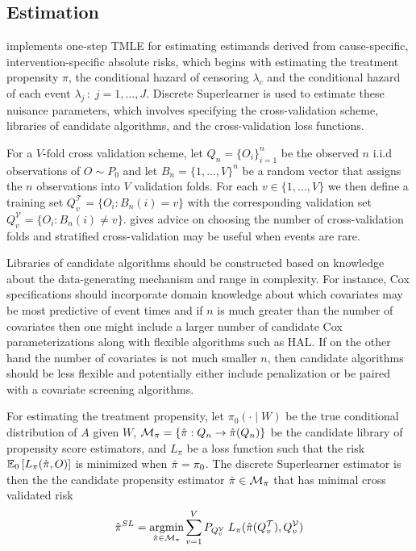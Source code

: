 \documentclass{report}
\DeclareMathOperator*{\argmin}{argmin}
\newcommand{\1}{\ensuremath{\mathbf{1}}}
\newcommand{\X}{\ensuremath{{W}}}
\newcommand{\g}{\ensuremath{\pi}}
\begin{document}
\subsection{Estimation}
\label{estimation}
 implements one-step TMLE for estimating estimands derived from cause-specific, intervention-specific absolute risks, which begins with estimating the treatment propensity \(\g\), the conditional hazard of censoring \(\lambda_c\) and the conditional hazard of each event \(\lambda_j \,:\; j = 1, \dots, J\). Discrete Superlearner is used to estimate these nuisance parameters, which involves specifying the cross-validation scheme, libraries of candidate algorithms, and the cross-validation loss functions.

For a \(V\text{-fold}\) cross validation scheme, let \(Q_n = \{O_i\}_{i=1}^n\) be the observed \(n\) i.i.d observations of \(O \sim P_0\) and let \(B_n = \{1, ... , V\}^n\) be a random vector that assigns the \(n\) observations into \(V\) validation folds. For each \(v \in \{1, ..., V\}\) we then define a training set \(Q^\mathcal{T}_v = \{O_i : B_n(i) = v\}\) with the corresponding validation set \(Q^\mathcal{V}_v = \{O_i : B_n(i) \neq v\}\). \cite{phillips_practical_2022} gives advice on choosing the number of cross-validation folds and stratified cross-validation may be useful when events are rare. 

Libraries of candidate algorithms should be constructed based on knowledge about the data-generating mechanism and range in complexity. For instance, Cox specifications should incorporate domain knowledge about which covariates may be most predictive of event times and if \(n\) is much greater than the number of covariates then one might include a larger number of candidate Cox parameterizations along with flexible algorithms such as HAL. If on the other hand the number of covariates is not much smaller \(n\), then candidate algorithms should be less flexible and potentially either include penalization or be paired with a covariate screening algorithms.

For estimating the treatment propensity, let \(\g_0(\cdot \mid \X)\) be the true conditional distribution of \(A\) given \(\X\), \(\mathcal{M}_{\g} = \left\{\Hat{\g} : Q_n \to \Hat{\g}(Q_n) \right\}\) be the candidate library of propensity score estimators, and \(L_\g\) be a loss function such that the risk \(\mathbb{E}_0\left[L_\g(\Hat{\g}, O)\right]\) is minimized when \(\Hat{\g} = \g_0\). The discrete Superlearner estimator is then the the candidate propensity estimator \(\Hat{\g} \in \mathcal{M}_{\g}\) that has minimal cross validated risk
\begin{equation}
\Hat{\g}^{SL} = \argmin_{\Hat{\g} \in \mathcal{M}_\g} \sum_{v = 1}^{V} P_{Q^\mathcal{V}_v} \; L_\g(\Hat{\g}(Q^\mathcal{T}_v), Q^\mathcal{V}_v) \label{propsl}
\end{equation}
\end{document}
